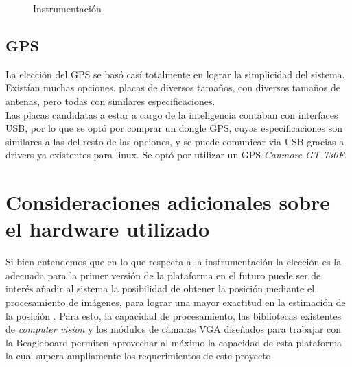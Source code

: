\documentclass[main]{subfiles}
\begin{document}
\begin{figure} 
  \vspace{-40pt}
  \centering
  \hspace{2cm}
  
  \caption{Instrumentaci\'on}
  \label{fig:intrumentacion}
\end{figure}

\subsection{GPS}

La elecci\'on del GPS se bas\'o cas\'i totalmente en lograr la simplicidad del sistema. Exist\'ian muchas opciones, placas de diversos tama\~nos, con diversos tama\~nos de antenas, pero todas con similares especificaciones.\\

Las placas candidatas a estar a cargo de la inteligencia contaban con interfaces USB, por lo que se opt\'o por comprar un dongle GPS, cuyas especificaciones son similares a las del resto de las opciones, y se puede comunicar via USB gracias a drivers ya existentes para linux. Se opt\'o por utilizar un GPS \textit{Canmore GT-730F}.

\section{Consideraciones adicionales sobre el hardware utilizado}

Si bien entendemos que en lo que respecta a la instrumentaci\'on la elecci\'on es la adecuada para la primer versi\'on de la plataforma en el futuro puede ser de inter\'es añadir al sistema la posibilidad de obtener la posici\'on mediante el procesamiento de im\'agenes, para lograr una mayor exactitud en la estimaci\'on de la posici\'on . Para esto, la capacidad de procesamiento, las bibliotecas existentes de \emph{computer vision} y los m\'odulos de c\'amaras VGA dise\~nados para trabajar con la Beagleboard permiten aprovechar al m\'aximo la capacidad de esta plataforma la cual supera ampliamente los requerimientos de este proyecto.\\

 
\end{document}
